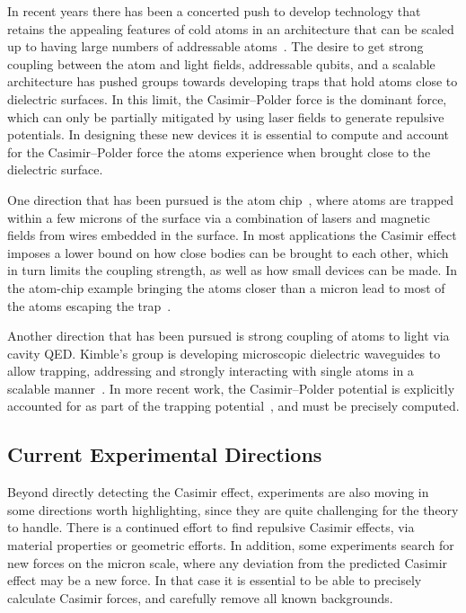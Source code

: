 In recent years there has been a concerted push to develop technology that retains the appealing features 
of cold atoms in an architecture that can be scaled up to having large numbers of addressable 
atoms~\cite{Kimble2008}.  
The desire to get strong coupling between the atom and light fields, addressable qubits, and a scalable
architecture has pushed groups towards developing traps that hold atoms close to dielectric surfaces.  
In this limit, the Casimir--Polder force is the dominant force, which can only be partially mitigated
by using laser fields to generate repulsive potentials.
In designing these new devices it is essential to compute and account for the Casimir--Polder force
the atoms experience when brought close to the dielectric surface.  

One direction that has been pursued is the atom chip~\cite{Folman2000,Schneider2003,Salem2010},
where atoms are trapped within a few microns of the surface via a combination of lasers and magnetic fields from wires embedded in
the surface.  %
In most applications the Casimir effect imposes a lower bound on how close bodies can be brought 
to each other, which in turn limits the coupling strength, as well as how small devices can be made.
In the atom-chip example bringing the atoms closer than a micron lead to most of the atoms escaping the 
trap~\cite{Lin2004}.

Another direction that has been pursued is strong coupling of atoms to light via cavity QED.  
Kimble's group is developing microscopic dielectric waveguides to allow trapping, addressing and strongly interacting with  
single atoms in a scalable manner~\cite{Alton2011, Hung2013, Goban2014}.  In more recent work,
the Casimir--Polder potential is explicitly accounted for as part of the trapping potential~\cite{Goban2014},
and must be precisely computed.

\subsection{Current Experimental Directions}

Beyond directly detecting the Casimir effect, experiments are also moving in some directions worth highlighting,
since they are quite challenging for the theory to handle.
There is a continued effort to find repulsive Casimir effects, via material properties or geometric efforts.
In addition, some experiments search for new forces on the micron scale, where any deviation from the predicted
Casimir effect may be a new force.  In that case it is essential to be able to precisely calculate
Casimir forces, and carefully remove all known backgrounds. 

